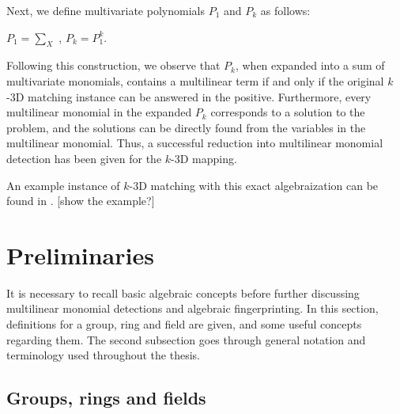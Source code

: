Next, we define multivariate polynomials $P_1$ and $P_k$ as follows:
\begin{center}$P_1 = \displaystyle \sum_{X}$ ,   $P_k = P_1^k$.\end{center}

Following this construction, we observe that $P_k$, when expanded into a sum of multivariate monomials, 
contains a multilinear term if and only if the original $k$-3D matching instance can be answered in the positive. 
Furthermore, every multilinear monomial in the expanded $P_k$ corresponds to a solution to the problem, and 
the solutions can be directly found from the variables in the multilinear monomial. Thus, 
a successful reduction into multilinear monomial detection has been given for the $k$-3D mapping.\nl

An example instance of $k$-3D matching with this exact algebraization can be found in \cite{KouWil15}. [show the example?]\nl




\section{Preliminaries}

It is necessary to recall basic algebraic concepts 
before further discussing multilinear monomial detections and algebraic fingerprinting. 
In this section, definitions for a group, ring and field are given, and some useful concepts 
regarding them. The second subsection goes through general notation and terminology used 
throughout the thesis.

\subsection{Groups, rings and fields} %

